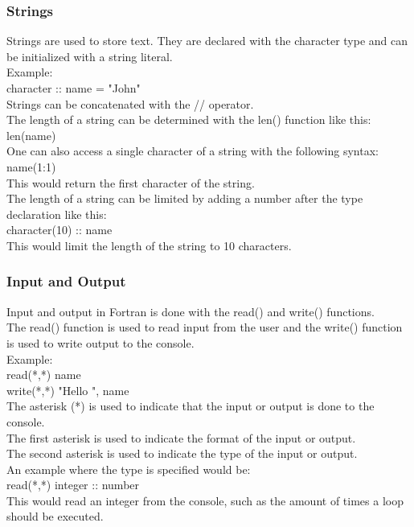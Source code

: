 \documentclass[11pt,a4paper]{scrartcl}
\begin{document}
\begin{center}
\subsubsection{Strings}
Strings are used to store text. They are declared with the character type and can be initialized with a string literal.\\
Example:\\
character :: name = "John"\\
Strings can be concatenated with the // operator.\\
The length of a string can be determined with the len() function like this:\\
len(name)\\
One can also access a single character of a string with the following syntax:\\
name(1:1)\\
This would return the first character of the string.\\
The length of a string can be limited by adding a number after the type declaration like this:\\
character(10) :: name\\
This would limit the length of the string to 10 characters.\\

\subsubsection{Input and Output} %
Input and output in Fortran is done with the read() and write() functions.\\
The read() function is used to read input from the user and the write() function is used to write output to the console.\\
Example:\\
read(*,*) name\\
write(*,*) "Hello ", name\\
The asterisk (*) is used to indicate that the input or output is done to the console.\\
The first asterisk is used to indicate the format of the input or output.\\
The second asterisk is used to indicate the type of the input or output.\\
An example where the type is specified would be:\\
read(*,*) integer :: number\\
This would read an integer from the console, such as the amount of times a loop should be executed.\\


\end{center}
\end{document}
